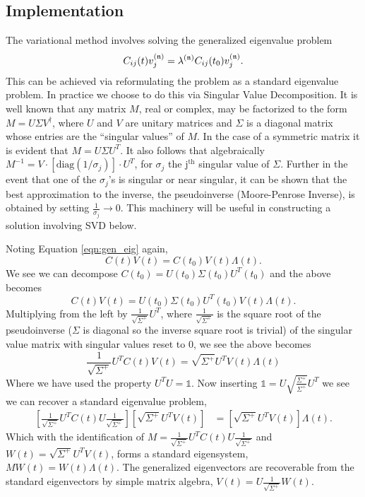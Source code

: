 \subsection{Implementation}
The variational method involves solving the generalized eigenvalue problem 
\begin{equation}
C_{ij}(t)v^{(\mathfrak{n})}_j   = \lambda^{(\mathfrak{n})} C_{ij}(t_0)v^{(\mathfrak{n})}_j. \label{eqn:gen_eig}
\end{equation}
This can be achieved via reformulating the problem as a standard eigenvalue problem. In practice we choose to do this via Singular Value Decomposition.  It is well known that any matrix $M$, real or complex, may be factorized to the form $M = U\Sigma V^{\dagger}$, where $U$ and $V$ are unitary matrices and $\Sigma$ is a diagonal matrix whose entries are the ``singular values'' of $M$. In the case of a symmetric  matrix it is evident that $M = U\Sigma U^T$. It also follows that algebraically $M^{-1} = V\cdot [\mathrm{diag}(1/\sigma_j)]\cdot U^T$, for $\sigma_j$ the j$^{\text{th}}$ singular value of $\Sigma$.  Further in the event that one of the $\sigma_j$'s is singular or near singular, it can be shown that the best approximation to the inverse, the pseudoinverse (Moore-Penrose Inverse), is obtained by setting $\frac{1}{\sigma_j} \rightarrow 0$. This machinery will be useful in constructing a solution involving SVD below.
\par
Noting Equation \ref{eqn:gen_eig} again,
\begin{equation*}
C(t)V(t) = C(t_0)V(t)\Lambda(t).
\end{equation*}
We see we can decompose $C(t_0) = U(t_0)\Sigma(t_0)U^T(t_0)$ and the above becomes
\begin{equation*}
C(t)V(t) = U(t_0)\Sigma(t_0)U^T(t_0)V(t)\Lambda(t).
\end{equation*}
Multiplying from the left by $\frac{1}{\sqrt{\Sigma^{+}}}U^T$, where $\frac{1}{\sqrt{\Sigma^{+}}}$ is the square root of the pseudoinverse ($\Sigma$ is diagonal so the inverse square root is trivial) of the singular value matrix with singular values reset to 0, we see the above becomes
\begin{equation*}
\frac{1}{\sqrt{\Sigma^{+}}}U^TC(t)V(t) = \sqrt{\Sigma^{+}}U^TV(t)\Lambda(t)
\end{equation*}
Where we have used the property $U^TU = \mathbb{1}$.  Now inserting $\mathbb{1} = U\sqrt{\frac{\Sigma^{+}}{\Sigma^{+}}}U^T$ we see we can recover a standard eigenvalue problem,
\begin{align*}
\label{eqn:svd_gen_eig}
\left[\frac{1}{\sqrt{\Sigma^{+}}}U^TC(t)U\frac{1}{\sqrt{\Sigma^{+}}}\right] \left[\sqrt{\Sigma^{+}}U^TV(t)\right] &= \left[\sqrt{\Sigma^{+}}U^TV(t)\right]\Lambda(t).
\end{align*}
Which with the identification of $M = \frac{1}{\sqrt{\Sigma^{+}}}U^TC(t)U\frac{1}{\sqrt{\Sigma^{+}}}$ and $W(t) = \sqrt{\Sigma^{+}}U^TV(t)$, forms a standard eigensystem, $M W(t) = W(t)\Lambda(t)$. The generalized eigenvectors are recoverable from the standard eigenvectors by simple matrix algebra, $V(t) = U\frac{1}{\sqrt{\Sigma^{+}}}W(t)$. 

